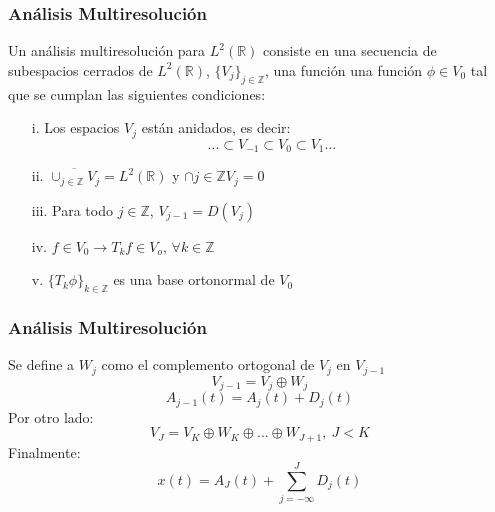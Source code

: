 \documentclass{beamer}
\begin{document}
  
  \begin{frame}
   \frametitle{ Análisis Multiresolución }
   Un análisis multiresolución para $L^{2}(\mathbb{R})$ consiste en una secuencia de subespacios cerrados de $L^{2}(\mathbb{R})$, $\{ V_{j} \}_{j \in \mathbb{Z} }$, una función  una función $\phi \in V_{0}$ tal que se cumplan las siguientes condiciones:

   \begin{itemize}
   \item[i.] Los espacios $V_{j}$ están anidados, es decir:
   \begin{equation*}
   ... \subset V_{-1} \subset V_{0} \subset V_{1} ...
   \end{equation*}
   \item[ii.] $\overline{\cup _{j\in \mathbb Z}V_j} = L^2(\mathbb R)$ y $\cap {j\in \mathbb Z}V_j = {0}$
   \item[iii.] Para todo $j \in \mathbb{Z}$, $V_{j-1}=D(V_j)$
   \item[iv.] $f \in V_0 \rightarrow T_kf \in V_o$, $\forall k \in \mathbb{Z}$
   \item[v.] $\{T_k \phi \}_{k \in \mathbb{Z}}$ es una base ortonormal de $V_0$
   \end{itemize} 
  \end{frame}
\begin{frame}
  \frametitle{Análisis Multiresolución}
 Se define a $W_j$ como el complemento ortogonal de $V_j$ en $V_{j-1}$
  \begin{equation}
    \label{Central}
    V_{j-1} = V_j \oplus W_j
  \end{equation}
  \begin{equation}
    \label{NivApDet}
    A_{j-1}(t) = A_j(t) + D_j(t) 
  \end{equation} 
Por otro lado:
\begin{equation}
  V_J = V_K \oplus W_K \oplus ... \oplus W_{J+1}, \: J<K
  \label{eq.Vj}
  \end{equation}
Finalmente:
\begin{equation}
  x(t) = A_J(t) + \sum_{j=-\infty}^{J}D_j(t)
  \end{equation}

\end{frame}
\end{document}
